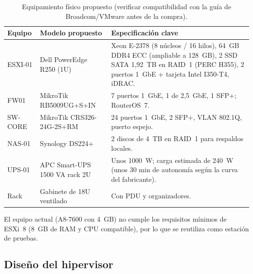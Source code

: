 \begin{table}[htbp]
\centering
\caption{Equipamiento físico propuesto (verificar compatibilidad con la guía de Broadcom/VMware antes de la compra).}
\label{tab:ce03-hardware}
\small
\begin{tabularx}{\textwidth}{L{2.4cm}L{4.4cm}X}
\toprule
\textbf{Equipo} & \textbf{Modelo propuesto} & \textbf{Especificación clave} \\
\midrule
ESXI-01 & Dell PowerEdge R250 (1U) & Xeon E-2378 (8 núcleos / 16 hilos), 64~GB DDR4 ECC (ampliable a 128~GB), 2 SSD SATA 1,92~TB en RAID~1 (PERC H355), 2 puertos 1~GbE + tarjeta Intel I350-T4, iDRAC. \\
FW01 & MikroTik RB5009UG+S+IN & 7 puertos 1~GbE, 1 de 2,5~GbE, 1 SFP+; RouterOS~7. \\
SW-CORE & MikroTik CRS326-24G-2S+RM & 24 puertos 1~GbE, 2 SFP+, VLAN 802.1Q, puerto espejo. \\
NAS-01 & Synology DS224+ & 2 discos de 4~TB en RAID~1 para respaldos locales. \\
UPS-01 & APC Smart-UPS 1500 VA rack 2U & Unos 1000~W; carga estimada de 240~W (unos 30 min de autonomía según la curva del fabricante). \\
Rack & Gabinete de 18U ventilado & Con PDU y organizadores. \\
\bottomrule
\end{tabularx}
\end{table}

\noindent El equipo actual (A8-7600 con 4~GB) no cumple los requisitos mínimos de ESXi~8
(8~GB de RAM y CPU compatible), por lo que se reutiliza como estación de pruebas.

\subsection{Diseño del hipervisor}

